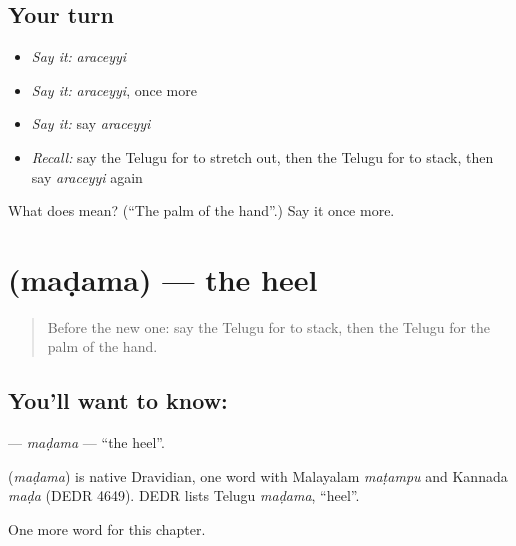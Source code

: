 \subsection*{Your turn}
\begin{itemize}
\raggedright
  \item \emph{Say it:} \emph{araceyyi}
  \item \emph{Say it:} \emph{araceyyi}, once more
  \item \emph{Say it:} say \emph{araceyyi}
  \item \emph{Recall:} say the Telugu for to stretch out, then the Telugu for to stack, then say \emph{araceyyi} again
\end{itemize}

\begin{tcolorbox}[breakable,colback=teal!4,colframe=teal!35!black,title={Before you move on}]
What does  mean? (\textquotedblleft{}The palm of the hand\textquotedblright{}.) Say it once more.
\end{tcolorbox}
\section[\texorpdfstring{\te{మడమ} (maḍama)}{మడమ (maḍama)}]{ (maḍama) — the heel}

\label{lesson:TE-C250-madama}



\begin{quote}
Before the new one: say the Telugu for to stack, then the Telugu for the palm of the hand.
\end{quote}

\subsection*{You'll want to know: }
\textbf{} — \emph{maḍama} — \textquotedblleft{}the heel\textquotedblright{}.

\begin{cousinweb}
\textbf{} (\emph{maḍama}) is native Dravidian, one word with Malayalam \emph{maṭampu} and Kannada \emph{maḍa} (DEDR 4649). DEDR lists Telugu \emph{maḍama}, \textquotedblleft{}heel\textquotedblright{}.
\end{cousinweb}

\begin{grammarlens}[title={What you've built}]
One more word for this chapter.
\end{grammarlens}

